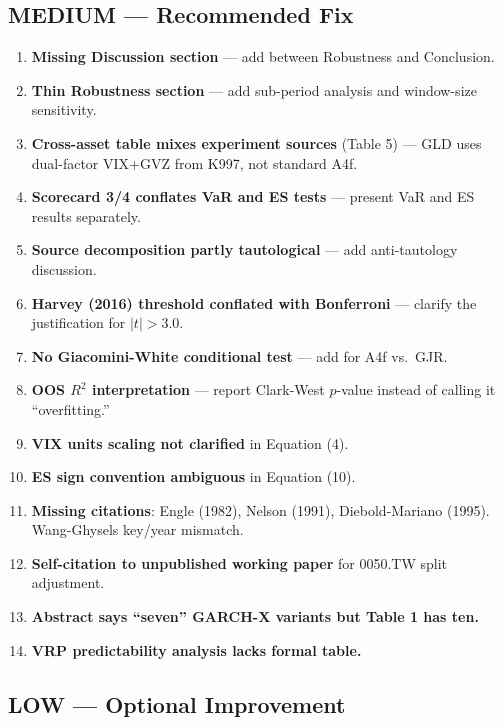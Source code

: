 \documentclass[12pt,a4paper]{article}
\begin{document}
\subsection*{\textcolor{warncolor}{MEDIUM --- Recommended Fix}}

\begin{enumerate}[label=M\arabic*.]
\item \textbf{Missing Discussion section} --- add between Robustness and Conclusion.
\item \textbf{Thin Robustness section} --- add sub-period analysis and window-size sensitivity.
\item \textbf{Cross-asset table mixes experiment sources} (Table 5) --- GLD uses dual-factor VIX+GVZ from K997, not standard A4f.
\item \textbf{Scorecard 3/4 conflates VaR and ES tests} --- present VaR and ES results separately.
\item \textbf{Source decomposition partly tautological} --- add anti-tautology discussion.
\item \textbf{Harvey (2016) threshold conflated with Bonferroni} --- clarify the justification for $|t| > 3.0$.
\item \textbf{No Giacomini-White conditional test} --- add for A4f vs.\ GJR.
\item \textbf{OOS $R^2$ interpretation} --- report Clark-West $p$-value instead of calling it ``overfitting.''
\item \textbf{VIX units scaling not clarified} in Equation (4).
\item \textbf{ES sign convention ambiguous} in Equation (10).
\item \textbf{Missing citations}: Engle (1982), Nelson (1991), Diebold-Mariano (1995). Wang-Ghysels key/year mismatch.
\item \textbf{Self-citation to unpublished working paper} for 0050.TW split adjustment.
\item \textbf{Abstract says ``seven'' GARCH-X variants but Table 1 has ten.}
\item \textbf{VRP predictability analysis lacks formal table.}
\end{enumerate}

\subsection*{LOW --- Optional Improvement}
\end{document}
